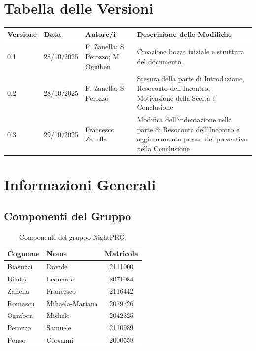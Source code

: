 \documentclass[a4paper, 11pt, oneside]{scrartcl} %
\begin{document}
\section*{Tabella delle Versioni}
\vspace{0.2cm} 
\begin{center}
\renewcommand{\arraystretch}{1.2}
\begin{tabular}{@{}llp{}p{}@{}} 
\toprule
\textbf{Versione} & \textbf{Data} & \textbf{Autore/i} & \textbf{Descrizione delle Modifiche} \\
\midrule
0.1 & 28/10/2025 & F. Zanella; S. Perozzo; M. Ogniben & Creazione bozza iniziale e struttura del documento. \\
0.2 & 28/10/2025 & F. Zanella; S. Perozzo & Stesura della parte di Introduzione, Resoconto dell'Incontro, Motivazione della Scelta e Conclusione \\
0.3 & 29/10/2025 & Francesco Zanella & Modifica dell'indentazione nella parte di Resoconto dell'Incontro e aggiornamento prezzo del preventivo nella Conclusione \\

\bottomrule
\end{tabular}
\end{center}


\newpage
\tableofcontents %
\pagestyle{fancy}

\newpage
\section{Informazioni Generali}

\subsection{Componenti del Gruppo}

\begin{table}[h!]
\centering
\renewcommand{\arraystretch}{1.2} %
\begin{tabular}{@{}llc@{}}
\toprule
\textbf{Cognome} & \textbf{Nome} & \textbf{Matricola} \\
\midrule
Biasuzzi & Davide & 2111000 \\
Bilato & Leonardo & 2071084 \\
Zanella & Francesco & 2116442 \\
Romascu & Mihaela-Mariana & 2079726 \\
Ogniben & Michele & 2042325 \\
Perozzo & Samuele & 2110989 \\
Ponso & Giovanni & 2000558 \\
\bottomrule
\end{tabular}
\caption{Componenti del gruppo NightPRO.}
\end{table}
\end{document}
